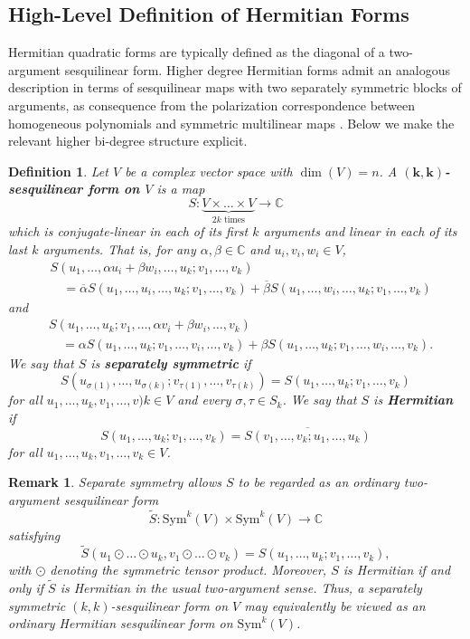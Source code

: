 \documentclass[11pt]{article}
\newtheorem{defn}[theorem]{Definition}
\newtheorem{remark}[theorem]{Remark}
\begin{document}
\subsection{High-Level Definition of Hermitian Forms}\label{High-Level Definition of Hermitian Forms}
Hermitian quadratic forms are typically defined as the diagonal of a two-argument sesquilinear form. Higher degree Hermitian forms admit an analogous description in terms of sesquilinear maps with two separately symmetric blocks of arguments, as consequence from the polarization correspondence between homogeneous polynomials and symmetric multilinear maps \cite{thomas2014polarization}. Below we make the relevant higher bi-degree structure explicit. 
\begin{defn}
    Let $V$ be a complex vector space with $\dim(V)=n$. A \textbf{$\boldsymbol{(k,k)}$-sesquilinear form on $V$} is a map 
    \[S:\underbrace{V\times\dots\times V}_{2k\text{ times}}\rightarrow \mathbb{C}\]
    which is conjugate-linear in each of its first $k$ arguments and linear in each of its last $k$ arguments. That is, for any $\alpha,\beta\in \mathbb{C}$ and $u_i,v_i,w_i\in V$, 
    \begin{align*}
        &S(u_1,\dots,\alpha u_i+\beta w_i,\dots,u_k;v_1,\dots,v_k) \\
        &\quad = \overline{\alpha}S(u_1,\dots,u_i,\dots,u_k;v_1,\dots,v_k)+\overline{\beta}S(u_1,\dots,w_i,\dots,u_k;v_1,\dots,v_k)
    \end{align*}
    and 
    \begin{align*}
        &S(u_1,\dots,u_k;v_1,\dots,\alpha v_i + \beta w_i,\dots,v_k) \\
        &\quad = \alpha S(u_1,\dots,u_k;v_1,\dots,v_i,\dots,v_k)+\beta S(u_1,\dots,u_k;v_1,\dots,w_i,\dots,v_k).
    \end{align*}
    We say that $S$ is \textbf{separately symmetric} if 
    \[S(u_{\sigma(1)},\dots,u_{\sigma(k)};v_{\tau(1)},\dots,v_{\tau(k)}) = S(u_1,\dots,u_k;v_1,\dots,v_k)\]
    for all $u_1,\dots,u_k,v_1,\dots,v)k\in V$ and every $\sigma,\tau\in S_k$. We say that $S$ is \textbf{Hermitian} if 
    \[S(u_1,\dots,u_k;v_1,\dots,v_k) = \overline{S(v_1,\dots,v_k;u_1,\dots,u_k)}\]
    for all $u_1,\dots,u_k,v_1,\dots,v_k\in V$. 
\end{defn}
\begin{remark}
    Separate symmetry allows $S$ to be regarded as an ordinary two-argument sesquilinear form 
    \[\widetilde{S}:\mathrm{Sym}^k(V)\times \mathrm{Sym}^k(V)\rightarrow \mathbb{C}\]
    satisfying 
    \[\widetilde{S}(u_1\odot\dots\odot u_k, v_1\odot\dots\odot v_k) = S(u_1,\dots,u_k;v_1,\dots,v_k),\]
    with $\odot$ denoting the symmetric tensor product. Moreover, $S$ is Hermitian if and only if $\widetilde{S}$ is Hermitian in the usual two-argument sense. Thus, a separately symmetric $(k,k)$-sesquilinear form on $V$ may equivalently be viewed as an ordinary Hermitian sesquilinear form on $\mathrm{Sym}^k(V)$. 
\end{remark}
\end{document}
